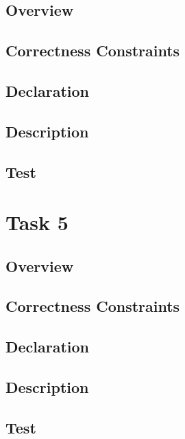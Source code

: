 \documentclass{article}
\begin{document}
\subsection{Overview}
\subsection{Correctness Constraints}
\subsection{Declaration}
\subsection{Description}
\subsection{Test}

\section{Task 5}
\subsection{Overview}
\subsection{Correctness Constraints}
\subsection{Declaration}
\subsection{Description}
\subsection{Test}
\end{document}
